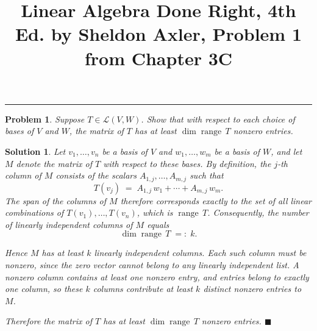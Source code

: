 \documentclass[12pt]{article}
\theoremstyle{problem}
\newtheorem*{problem}{Problem}
\theoremstyle{solution}
\newtheorem*{solution}{Solution}
\newcommand{\range}{\operatorname{range}}
\begin{document}
 
\title{Linear Algebra Done Right, 4th Ed. by Sheldon Axler, Problem 1 from Chapter 3C}
\maketitle
\vspace{-1.5em}
\begin{center}
  \rule{0.45\textwidth}{0.4pt}
\end{center}
\vspace{0.5em}
 
\begin{problem}
Suppose $T \in \mathcal{L}(V, W)$. Show that with respect to each choice of
bases of $V$ and $W$, the matrix of $T$ has at least $\dim \range\, T$ nonzero
entries.
\end{problem}
 
\bigskip
 
\begin{solution}
Let $v_1, \ldots, v_n$ be a basis of $V$ and $w_1, \ldots, w_m$ be a basis
of $W$, and let $M$ denote the matrix of $T$ with respect to these bases.
By definition, the $j$-th column of $M$ consists of the scalars
$A_{1,j}, \ldots, A_{m,j}$ such that
\[
    T(v_j) \;=\; A_{1,j}\,w_1 + \cdots + A_{m,j}\,w_m.
\]
The span of the columns of $M$ therefore corresponds exactly to the set of
all linear combinations of $T(v_1), \ldots, T(v_n)$, which is $\range\, T$.
Consequently, the number of linearly independent columns of $M$ equals
\[
    \dim \range\, T \;=:\; k.
\]
 
Hence $M$ has at least $k$ linearly independent columns.  Each such column
must be nonzero, since the zero vector cannot belong to any linearly
independent list.  A nonzero column contains at least one nonzero entry, and
entries belong to exactly one column, so these $k$ columns contribute at
least $k$ \emph{distinct} nonzero entries to $M$.
 
Therefore the matrix of $T$ has at least $\dim \range\, T$ nonzero
entries. \hfill$\blacksquare$
\end{solution}
 
\end{document}
